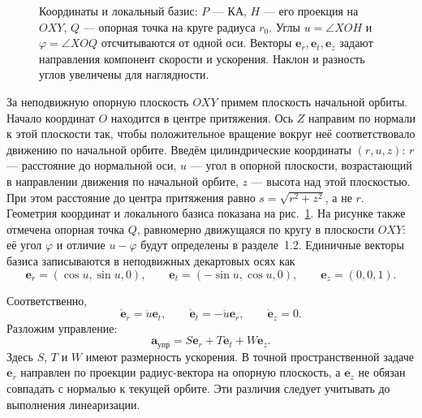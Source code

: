 \documentclass[a4paper,11pt]{article}
\numberwithin{equation}{section}
\theoremstyle{remark}
\begin{document}
\begin{figure}[H]
{
}
\caption{Координаты и локальный базис: $P$ --- КА, $H$ --- его проекция
на $OXY$, $Q$ --- опорная точка на круге радиуса $r_0$.
Углы $u=\angle XOH$ и $\varphi=\angle XOQ$ отсчитываются от одной оси.
Векторы $\boldsymbol e_r,\boldsymbol e_t,\boldsymbol e_z$ задают направления
компонент скорости и ускорения. Наклон и разность углов увеличены для наглядности.}
\label{fig:cylindrical-coordinates}
\end{figure}

За неподвижную опорную плоскость $OXY$ примем плоскость начальной орбиты.
Начало координат $O$ находится в центре притяжения. Ось $Z$ направим
по нормали к этой плоскости так, чтобы положительное вращение вокруг
неё соответствовало движению по начальной орбите.
Введём цилиндрические координаты $(r,u,z)$: $r$ --- расстояние до
нормальной оси, $u$ --- угол в опорной плоскости, возрастающий в
направлении движения по начальной орбите, $z$ --- высота над этой
плоскостью. При этом расстояние до центра притяжения равно
$s=\sqrt{r^2+z^2}$, а не $r$. Геометрия координат и локального базиса
показана на рис.~\ref{fig:cylindrical-coordinates}. На рисунке также отмечена
опорная точка $Q$, равномерно движущаяся по кругу в плоскости $OXY$:
её угол $\varphi$ и отличие $u-\varphi$ будут определены
в разделе~1.2. Единичные векторы базиса
записываются в неподвижных декартовых осях как
\begin {equation}
 \boldsymbol e_r=(\cos u,\sin u,0),\qquad
 \boldsymbol e_t=(-\sin u,\cos u,0),\qquad
 \boldsymbol e_z=(0,0,1).
 \label {eq:cylindrical-basis}
\end {equation}


Соответственно,
\[
 \dot{\boldsymbol e}_r=\dot u\boldsymbol e_t,\qquad
 \dot{\boldsymbol e}_t=-\dot u\boldsymbol e_r,
 \qquad \dot{\boldsymbol e}_z=0.
\]
Разложим управление:
\[
 \boldsymbol a_{\text{упр}}
 =S\boldsymbol e_r+T\boldsymbol e_t+W\boldsymbol e_z.
\]
Здесь $S$, $T$ и $W$ имеют размерность ускорения. В точной
пространственной задаче $\boldsymbol e_r$ направлен по проекции
радиус-вектора на опорную плоскость, а $\boldsymbol e_z$ не обязан
совпадать с нормалью к текущей орбите. Эти различия следует учитывать
до выполнения линеаризации.
\end{document}
